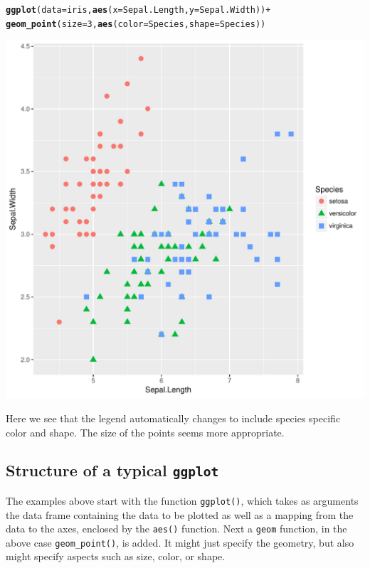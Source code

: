 \documentclass[12pt,oneside]{book}\usepackage[]{graphicx}\usepackage[]{color}
\makeatletter
\def\maxwidth{ %
  \ifdim\Gin@nat@width>\linewidth
    \linewidth
  \else
    \Gin@nat@width
  \fi
}
\newcommand{\hlnum}[1]{\textcolor[rgb]{0.686,0.059,0.569}{#1}}%
\newcommand{\hlopt}[1]{\textcolor[rgb]{0,0,0}{#1}}%
\newcommand{\hlstd}[1]{\textcolor[rgb]{0.345,0.345,0.345}{#1}}%
\newcommand{\hlkwc}[1]{\textcolor[rgb]{0.333,0.667,0.333}{#1}}%
\newcommand{\hlkwd}[1]{\textcolor[rgb]{0.737,0.353,0.396}{\textbf{#1}}}%
\newenvironment{kframe}{%
 \def\at@end@of@kframe{}%
 \ifinner\ifhmode%
  \def\at@end@of@kframe{\end{minipage}}%
  \begin{minipage}{\columnwidth}%
 \fi\fi%
 \def\FrameCommand##1{\hskip\@totalleftmargin \hskip-\fboxsep
 \colorbox{shadecolor}{##1}\hskip-\fboxsep
     \hskip-\linewidth \hskip-\@totalleftmargin \hskip\columnwidth}%
 \MakeFramed {\advance\hsize-\width
   \@totalleftmargin\z@ \linewidth\hsize
   \@setminipage}}%
 {\par\unskip\endMakeFramed%
 \at@end@of@kframe}
\newenvironment{knitrout}{}{} %
\makeatother
\begin{document}
\begin{knitrout}
\color{fgcolor}\begin{kframe}
\begin{alltt}
\hlkwd{ggplot}\hlstd{(}\hlkwc{data} \hlstd{= iris,} \hlkwd{aes}\hlstd{(}\hlkwc{x} \hlstd{= Sepal.Length,} \hlkwc{y} \hlstd{= Sepal.Width))} \hlopt{+}
    \hlkwd{geom_point}\hlstd{(}\hlkwc{size} \hlstd{=} \hlnum{3}\hlstd{,} \hlkwd{aes}\hlstd{(}\hlkwc{color}\hlstd{=Species,} \hlkwc{shape}\hlstd{=Species))}
\end{alltt}
\end{kframe}
\includegraphics[width=\maxwidth]{figure/unnamed-chunk-63-1} 

\end{knitrout}
Here we see that the legend automatically changes to include species specific color and shape. The size of the points seems more appropriate.

\subsection{Structure of a typical \texttt{ggplot}}
The examples above start with the function \verb+ggplot()+, which takes as arguments the data frame containing the data to be plotted as well as a mapping from the data to the axes, enclosed by the \verb+aes()+ function. Next a \verb+geom+ function, in the above case \verb+geom_point()+, is added. It might just specify the geometry, but also might specify aspects such as size, color, or shape. 
\end{document}
